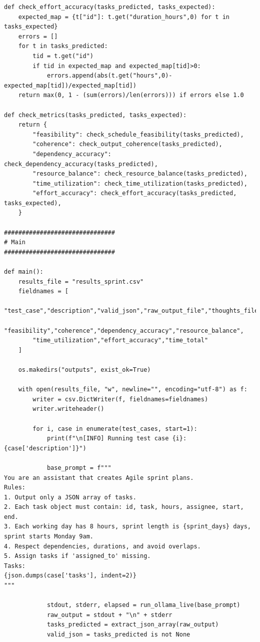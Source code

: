 \documentclass{report}
\begin{document}
\begin{lstlisting}[style=pythonstyle]
def check_effort_accuracy(tasks_predicted, tasks_expected):
    expected_map = {t["id"]: t.get("duration_hours",0) for t in tasks_expected}
    errors = []
    for t in tasks_predicted:
        tid = t.get("id")
        if tid in expected_map and expected_map[tid]>0:
            errors.append(abs(t.get("hours",0)-expected_map[tid])/expected_map[tid])
    return max(0, 1 - (sum(errors)/len(errors))) if errors else 1.0

def check_metrics(tasks_predicted, tasks_expected):
    return {
        "feasibility": check_schedule_feasibility(tasks_predicted),
        "coherence": check_output_coherence(tasks_predicted),
        "dependency_accuracy": check_dependency_accuracy(tasks_predicted),
        "resource_balance": check_resource_balance(tasks_predicted),
        "time_utilization": check_time_utilization(tasks_predicted),
        "effort_accuracy": check_effort_accuracy(tasks_predicted, tasks_expected),
    }

###############################
# Main
###############################

def main():
    results_file = "results_sprint.csv"
    fieldnames = [
        "test_case","description","valid_json","raw_output_file","thoughts_file",
        "feasibility","coherence","dependency_accuracy","resource_balance",
        "time_utilization","effort_accuracy","time_total"
    ]

    os.makedirs("outputs", exist_ok=True)

    with open(results_file, "w", newline="", encoding="utf-8") as f:
        writer = csv.DictWriter(f, fieldnames=fieldnames)
        writer.writeheader()

        for i, case in enumerate(test_cases, start=1):
            print(f"\n[INFO] Running test case {i}: {case['description']}")

            base_prompt = f"""
You are an assistant that creates Agile sprint plans.
Rules:
1. Output only a JSON array of tasks.
2. Each task object must contain: id, task, hours, assignee, start, end.
3. Each working day has 8 hours, sprint length is {sprint_days} days, sprint starts Monday 9am.
4. Respect dependencies, durations, and avoid overlaps.
5. Assign tasks if 'assigned_to' missing.
Tasks:
{json.dumps(case['tasks'], indent=2)}
"""

            stdout, stderr, elapsed = run_ollama_live(base_prompt)
            raw_output = stdout + "\n" + stderr
            tasks_predicted = extract_json_array(raw_output)
            valid_json = tasks_predicted is not None


\end{lstlisting}
\end{document}
